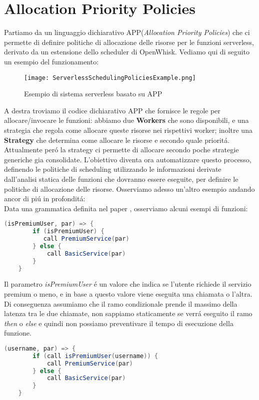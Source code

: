 \documentclass[../../main.tex]{subfiles}
\begin{document}
\section{Allocation Priority Policies}
Partiamo da un linguaggio dichiarativo APP(\textit{Allocation Priority Policies})\autocite{de2020allocation} che ci permette di definire politiche di allocazione delle risorse per le funzioni serverless, derivato da un estensione dello scheduler di OpenWhisk.
Vediamo qui di seguito un esempio del funzionamento:
\begin{figure}[H]
   \centering
    \texttt{[image: ServerlessSchedulingPoliciesExample.png]}
    \caption{Esempio di sistema serverless basato su APP}
\end{figure}
A destra troviamo il codice dichiarativo APP che fornisce le regole per allocare/invocare le funzioni: abbiamo due \textbf{Workers} che sono disponibili, e una strategia che regola come allocare queste risorse nei rispettivi worker; inoltre una \textbf{Strategy} che determina come allocare le risorse e secondo quale prioritá.
Attualmente peró la strategy ci permette di allocare secondo poche strategie generiche gia consolidate.
L'obiettivo diventa ora automatizzare questo processo, definendo le politiche di scheduling utilizzando le informazioni derivate dall'analisi statica delle funzioni che dovranno essere eseguite, per definire le politiche di allocazione delle risorse.
Osserviamo adesso un'altro esempio andando ancor di piú in profonditá:\\
Data una grammatica definita nel paper \autocite {deserverless}, osserviamo alcuni esempi di funzioni:
\begin{lstlisting}[language=Java, caption= La guardia della condizione é un espressione,label={lst:1}]
    (isPremiumUser, par) => {
        if (isPremiumUser) {
           call PremiumService(par)
        } else {
            call BasicService(par)
        }
    }
\end{lstlisting}

Il parametro \textit{isPremiumUser} é un valore che indica se l'utente richiede il servizio premium o meno, e in base a questo valore viene eseguita una chiamata o l'altra.
Di conseguenza assumiamo che il ramo condizionale prende il massimo della latenza tra le due chiamate, non sappiamo staticamente se verrá eseguito il ramo \textit{then} o \textit{else} e quindi non possiamo preventivare il tempo di esecuzione della funzione.

\begin{lstlisting}[language=Java, caption= La guardia della condizione é un'invocazione a un servizio esterno,label={lst:2}]
    (username, par) => {
        if (call isPremiumUser(username)) {
            call PremiumService(par)
        } else {
            call BasicService(par)
        }
    }
\end{lstlisting}
\end{document}
